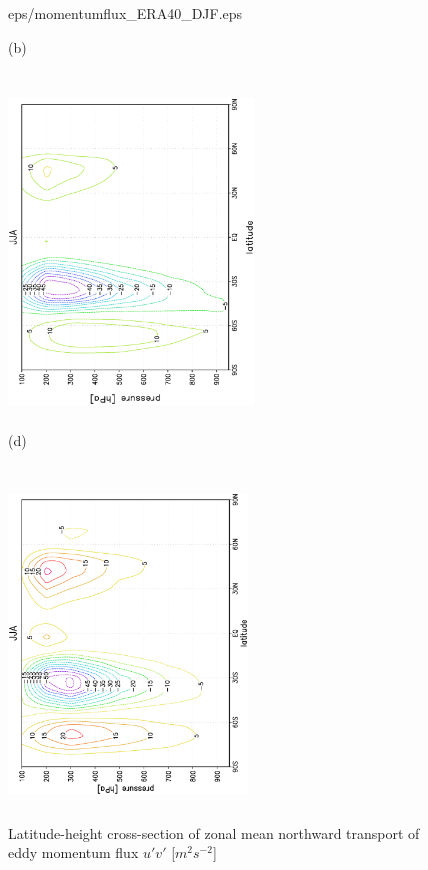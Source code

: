 \documentclass[12pt,a4paper,twoside,openright,headinclude,liststotoc,bibtotoc]{scrreprt}
\begin{document}
\begin{figure}[b]
{{eps/momentumflux_ERA40_DJF.eps}
}
\parbox{8.5cm}{\hspace{1.05cm}\begin{scriptsize}(b)\end{scriptsize} \vspace{-0.5cm} \\
\includegraphics[height=8.5cm,width=6.5cm,angle=-90]
{eps/tmJJAmomentumflux.eps}
}
\parbox{8.5cm}{\hspace{0.95cm}\begin{scriptsize}(d)\end{scriptsize} \vspace{-0.55cm} \\
\includegraphics[height=8.5cm,width=6.35cm,angle=-90]
{eps/momentumflux_ERA40_JJA.eps}
}
\caption[Eddy momentum flux for DJF and JJA]{Latitude-height cross-section of zonal mean northward transport of eddy momentum flux $u'v'$ [$m^{2}s^{-2}$]}
\label{img:eddymom}
\end{figure}
\end{document}
